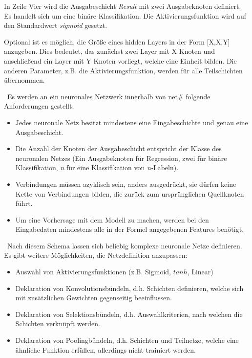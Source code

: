 In Zeile Vier wird die Ausgabeschicht \textit{Result} mit zwei Ausgabeknoten definiert. Es handelt sich um eine binäre Klassifikation. Die Aktivierungsfunktion wird auf den Standardwert \textit{sigmoid} gesetzt. 

Optional ist es möglich, die Größe eines hidden Layers in der Form [X,X,Y] anzugeben. Dies bedeutet, das zunächst zwei Layer mit X Knoten und anschließend ein Layer mit Y Knoten vorliegt, welche eine Einheit bilden. Die anderen Parameter, z.B. die Aktivierungsfunktion, werden für alle Teilschichten übernommen.

~\newline Es werden an ein neuronales Netzwerk innerhalb von net\# folgende Anforderungen gestellt:

\begin{itemize}
	\item Jedes neuronale Netz besitzt mindestens eine Eingabeschichte und genau eine Ausgabeschicht.
	\item Die Anzahl der Knoten der Ausgabeschicht entspricht der Klasse des neuronalen Netzes (Ein Ausgabeknoten für Regression, zwei für binäre Klassifikation, \textit{n} für eine Klassifikation von \textit{n-}Labeln).
	\item Verbindungen müssen azyklisch sein, anders ausgedrückt, sie dürfen keine Kette von Verbindungen bilden, die zurück zum ursprünglichen Quellknoten führt.
	\item Um eine Vorhersage mit dem Modell zu machen, werden bei den Eingabedaten mindestens alle in der Formel angegebenen Features benötigt. 
\end{itemize}

~\newline Nach diesem Schema lassen sich beliebig komplexe neuronale Netze definieren. Es gibt weitere Möglichkeiten, die Netzdefinition anzupassen:

\begin{itemize}
	\item Auswahl von Aktivierungsfunktionen (z.B. Sigmoid, $tanh$, Linear)
	\item Deklaration von Konvolutionsbündeln, d.h. Schichten definieren, welche sich mit zusätzlichen Gewichten gegenseitig beeinflussen.
	\item Deklaration von Selektionsbündeln, d.h. Auswahlkriterien, nach welchen die Schichten verknüpft werden.
	\item Deklaration von Poolingbündeln, d.h. Schichten und Teilnetze, welche eine ähnliche Funktion erfüllen, allerdings nicht trainiert werden. 
\end{itemize} 

